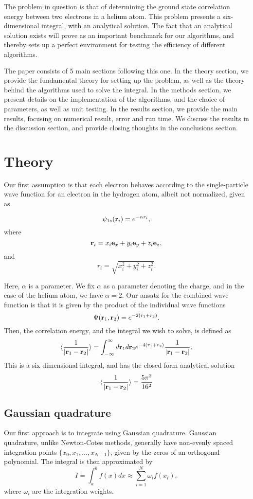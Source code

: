 \documentclass{emulateapj}
\begin{document}
The problem in question is that of determining the ground state correlation energy between two electrons in a helium atom. This problem presents a six-dimensional integral, with an analytical solution. The fact that an analytical solution exists will prove as an important benchmark for our algorithms, and thereby sets up a perfect environment for testing the efficiency of different algorithms.

The paper consists of 5 main sections following this one. In the theory section, we provide the fundamental theory for setting up the problem, as well as the theory behind the algorithms used to solve the integral. In the methods section, we present details on the implementation of the algorithms, and the choice of parameters, as well as unit testing. In the results section, we provide the main results, focusing on numerical result, error and run time. We discuss the results in the discussion section, and provide closing thoughts in the conclusions section.

\section{Theory}
\label{sec:method}
Our first assumption is that each electron behaves according to the single-particle wave function for an electron in the hydrogen atom, albeit not normalized, given as

\[
   \psi_{1s}({\bf r}_i)  =   e^{-\alpha r_i},
\]
where
\[
   {\bf r}_i =  x_i {\bf e}_x + y_i {\bf e}_y +z_i {\bf e}_z ,
\]
and
\[
r_i = \sqrt{x_i^2+y_i^2+z_i^2}.
\]

Here, $\alpha$ is a parameter. We fix $\alpha$ as a parameter denoting the charge, and in the case of the helium atom, we have $\alpha = 2$. Our ansatz for the combined wave function is that it is given by the product of the individual wave functions
\[
   \Psi({\bf r}_1,{\bf r}_2)  =   e^{-2 (r_1+r_2)}.
\]
Then, the correlation energy, and the integral we wish to solve, is defined as
\begin{equation}\label{eq:correlationenergy}
   \langle \frac{1}{|{\bf r}_1-{\bf r}_2|} \rangle =
   \int_{-\infty}^{\infty} d{\bf r}_1d{\bf r}_2  e^{-4 (r_1+r_2)}\frac{1}{|{\bf r}_1-{\bf r}_2|}.
\end{equation}
This is a six dimensional integral, and has the closed form analytical solution
\[
\langle \frac{1}{|{\bf r}_1-{\bf r}_2|} \rangle = \frac{5\pi^2}{16^2}
\]

\subsection{Gaussian quadrature}
Our first approach is to integrate using Gaussian quadrature. Gaussian quadrature, unlike Newton-Cotes methods, generally have non-evenly spaced integration points $\{x_0 , x_1 , \dots , x_{N-1}\}$, given by the zeros of an orthogonal polynomial. The integral is then approximated by
\begin{equation}
	I = \int_a^b f(x) dx \approx \sum^N_{i = 1} \omega_i f(x_i),
	\label{eq:quadrature}
\end{equation}
where $\omega_i$ are the integration weights.
\end{document}
